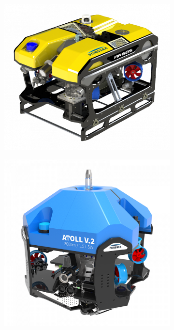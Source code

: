			\begin{figure}[!htb]
				\centering
				\begin{subfigure}[b]{0.3\textwidth}
					\centering
					\includegraphics[width=\textwidth]{imgs/Argos.png}
					\caption{\argos{}}
				\end{subfigure}
				\hfill
				\begin{subfigure}[b]{0.3\textwidth}
					\centering
					\includegraphics[width=\textwidth]{imgs/Atoll.png}

\end{subfigure}
\end{figure}
